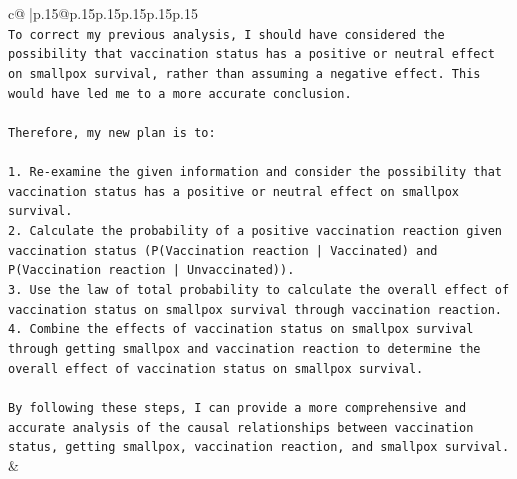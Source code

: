 \documentclass{article}
\begin{document}
{\begin{supertabular}{c@{$\;$}|p{.15\linewidth}@{}p{.15\linewidth}p{.15\linewidth}p{.15\linewidth}p{.15\linewidth}p{.15\linewidth}}
{{{\\ 
\texttt{To correct my previous analysis, I should have considered the possibility that vaccination status has a positive or neutral effect on smallpox survival, rather than assuming a negative effect. This would have led me to a more accurate conclusion.} \\
\\ 
\texttt{Therefore, my new plan is to:} \\
\\ 
\texttt{1. Re{-}examine the given information and consider the possibility that vaccination status has a positive or neutral effect on smallpox survival.} \\
\texttt{2. Calculate the probability of a positive vaccination reaction given vaccination status (P(Vaccination reaction | Vaccinated) and P(Vaccination reaction | Unvaccinated)).} \\
\texttt{3. Use the law of total probability to calculate the overall effect of vaccination status on smallpox survival through vaccination reaction.} \\
\texttt{4. Combine the effects of vaccination status on smallpox survival through getting smallpox and vaccination reaction to determine the overall effect of vaccination status on smallpox survival.} \\
\\ 
\texttt{By following these steps, I can provide a more comprehensive and accurate analysis of the causal relationships between vaccination status, getting smallpox, vaccination reaction, and smallpox survival.} \\
            }
        }
    }
    & \\ \\

\end{supertabular}
}
\end{document}
